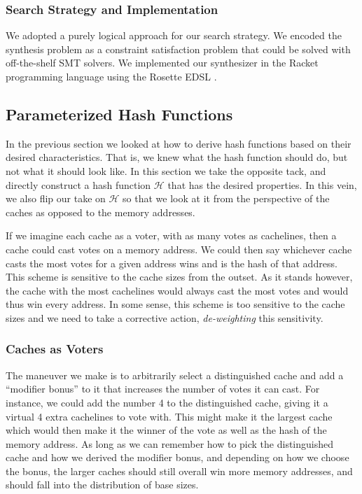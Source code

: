 \subsubsection{Search Strategy and Implementation}

We adopted a purely logical approach for our search strategy. We encoded the
synthesis problem as a constraint satisfaction problem that could be solved with
off-the-shelf SMT solvers. We implemented our synthesizer in the Racket
programming language using the Rosette EDSL \cite{rosette}.


\subsection{Parameterized Hash Functions}

In the previous section we looked at how to derive hash functions based on their
desired characteristics. That is, we knew what the hash function should do, but
not what it should look like. In this section we take the opposite tack, and
directly construct a hash function $\mathcal{H}$ that has the desired
properties. In this vein, we also flip our take on $\mathcal{H}$ so that we look
at it from the perspective of the caches as opposed to the memory addresses.

If we imagine each cache as a voter, with as many votes as cachelines, then a
cache could cast votes on a memory address.  We could then say whichever cache
casts the most votes for a given address wins and is the hash of that
address. This scheme is sensitive to the cache sizes from the outset. As it
stands however, the cache with the most cachelines would always cast the most
votes and would thus win every address.  In some sense, this scheme is too
sensitive to the cache sizes and we need to take a corrective action,
\textit{de-weighting} this sensitivity.

\subsubsection{Caches as Voters}
  
The maneuver we make is to arbitrarily select a distinguished cache and add a
``modifier bonus'' to it that increases the number of votes it can cast. For
instance, we could add the number 4 to the distinguished cache, giving it a
virtual 4 extra cachelines to vote with. This might make it the largest cache
which would then make it the winner of the vote as well as the hash of the
memory address.  As long as we can remember how to pick the distinguished cache
and how we derived the modifier bonus, and depending on how we choose the bonus,
the larger caches should still overall win more memory addresses, and should
fall into the distribution of base sizes.

